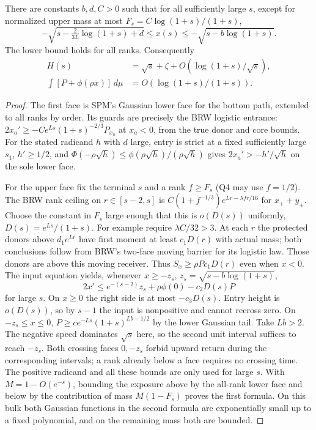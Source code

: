 \documentclass[11pt]{article}
\newcommand{\dd}{\,d}\newcommand{\E}{\mathbb E}
\begin{document}
\begin{lemma}\label{an04tbwv1:bulk}
There are constants $b,d,C>0$ such that for all sufficiently large
$s$, except for normalized upper mass at most
$F_s=C\log(1+s)/(1+s)$,
\[
 -\sqrt{s-\tfrac{2}{3L}\log(1+s)+d}\le x(s)
       \le-\sqrt{s-b\log(1+s)} .
\]
The lower bound holds for all ranks. Consequently
\begin{align}
 H(s)&=\sqrt s+\zeta+O(\log(1+s)/\sqrt{s}),\nonumber\\
 \int [P+\phi(\rho x)]\dd\mu&=O(\log(1+s)/(1+s)).
 \label{an04tbwv1:exposure}
\end{align}
\end{lemma}
\begin{proof}
The first face is SPM's Gaussian lower face for the bottom path,
extended to all ranks by order. Its guards are precisely the BRW
logistic entrance: $2x_a'\ge-Ce^{Ls}(1+s)^{-2/3}P_{x_a}$ at
$x_a<0$, from the true donor and core bounds. For the stated
radicand $h$ with $d$ large, entry is strict at a fixed sufficiently
large $s_1$, $h'\ge1/2$, and $\Phi(-\rho\sqrt h)\le
\phi(\rho\sqrt h)/(\rho\sqrt h)$ gives $2x_a'>-h'/\sqrt h$ on
the sole lower face.

For the upper face fix the terminal $s$ and a rank $f\ge F_s$
(Q4 may use $f=1/2$). The BRW rank ceiling on $r\in[s-2,s]$ is
$C(1+f^{-1/3})e^{Lr-\lambda f r/16}$ for $x_++y_+$.
Choose the constant in $F_s$ large enough that this is
$o(D(s))$ uniformly, $D(s)=e^{Ls}/(1+s)$. For example require
$\lambda C/32>3$. At each $r$ the protected donors above
$d_1e^{Lr}$ have first moment at least $c_1D(r)$ with actual
mass; both conclusions follow from BRW's two-face moving barrier
for its logistic law. Those donors are above this moving receiver.
Thus $S_x\ge\rho P c_1D(r)$ even when $x<0$. The input equation
yields, whenever $x\ge-z_s$, $z_s=\sqrt{s-b\log(1+s)}$,
\[
 2x'\le e^{-(s-2)}z_s+\rho\phi(0)-c_2 D(s)P
\]
for large $s$. On $x\ge0$ the right side is at most $-c_3D(s)$.
Entry height is $o(D(s))$, so by $s-1$ the input is nonpositive
and cannot recross zero. On $-z_s\le x\le0$,
$P\ge c e^{-Ls}(1+s)^{Lb-1/2}$ by the lower Gaussian tail.
Take $Lb>2$. The negative speed dominates $\sqrt s$ here, so the
second unit interval suffices to reach $-z_s$. Both crossing faces
$0,-z_s$ forbid upward return during the corresponding intervals;
a rank already below a face requires no crossing time.
The positive radicand and all these bounds are only used for large $s$.
With $M=1-O(e^{-s})$, bounding the exposure above by the all-rank
lower face and below by the contribution of mass $M(1-F_s)$ proves
the first formula. On this bulk both Gaussian functions in the
second formula are exponentially small up to a fixed polynomial,
and on the remaining mass both are bounded.
\end{proof}
\end{document}
